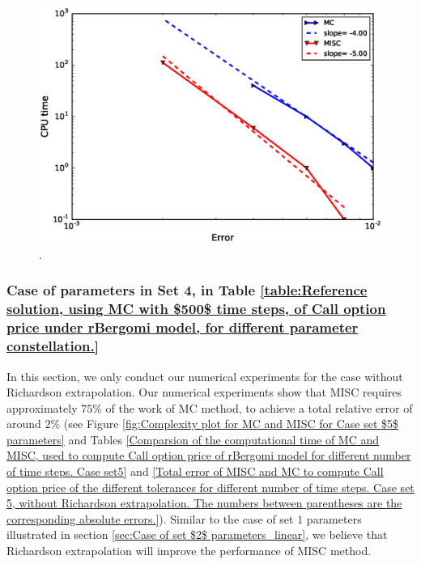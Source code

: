 	\begin{figure}[h!]
	\centering
	\includegraphics[width=0.5\linewidth]{./figures/rBergomi_Complexity_rates/set6/error_vs_time_set6_full_comparison}
	
	\caption{.}
	\label{fig:Complexity plot for MC and MISC for case set $4$ parameters}
\end{figure}
\FloatBarrier
\subsubsection{Case of parameters in Set 4, in Table \ref{table:Reference solution, using MC with $500$ time steps, of Call option price under rBergomi model, for different parameter constellation.} }\label{sec:Case of set 5 parameters}

In this section, we only conduct our numerical experiments for the case without Richardson extrapolation. Our numerical experiments show that  MISC requires  approximately $75\%$ of the work of MC method, to achieve a total relative error of around $2\%$  (see Figure \ref{fig:Complexity plot for MC and MISC for Case set $5$ parameters} and Tables \ref{Comparsion of the computational time of  MC and MISC, used to compute Call option price of rBergomi model for different number of time steps. Case set5} and \ref{Total error of MISC and MC to compute Call option price of the different tolerances for different number of time steps. Case set 5, without Richardson extrapolation. The numbers between parentheses are the corresponding absolute errors.}). Similar to the case of set $1$ parameters illustrated in section \ref{sec:Case of set $2$ parameters_linear}, we believe that Richardson extrapolation will improve the performance of MISC method.   

